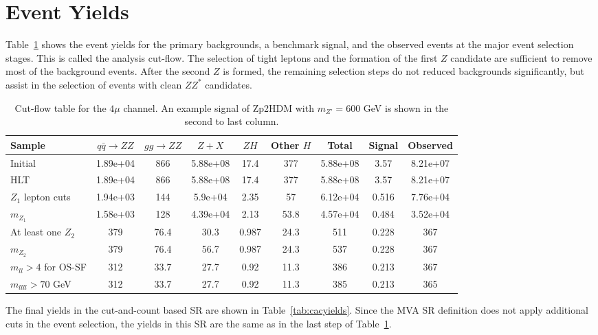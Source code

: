 \section{Event Yields}

Table~\ref{tab:smyields} shows the event yields for the primary backgrounds, a benchmark signal, and the observed events at the major event selection stages. This is called the analysis cut-flow. The selection of tight leptons and the formation of the first $Z$ candidate are sufficient to remove most of the background events. After the second $Z$ is formed, the remaining selection steps do not reduced backgrounds significantly, but assist in the selection of events with clean $ZZ^*$ candidates. 

\begin{table}[htbH]
\begin{center}
\begin{tabular}{ l | c | c | c | c | c | c | c | c }
\hline
\hline
Sample & $q\bar{q} \rightarrow ZZ$ & $gg \rightarrow ZZ$ & $Z+X$ & $ZH$ & Other $H$ & Total & Signal & Observed \\
\hline
Initial & 1.89e+04 & 866 & 5.88e+08 & 17.4 & 377 & 5.88e+08 & 3.57 & 8.21e+07 \\
\hline
HLT & 1.89e+04 & 866 & 5.88e+08 & 17.4 & 377 & 5.88e+08 & 3.57 & 8.21e+07 \\
\hline
$Z_1$ lepton cuts & 1.94e+03 & 144 & 5.9e+04 & 2.35 & 57 & 6.12e+04 & 0.516 & 7.76e+04 \\
\hline
$m_{Z_1}$ & 1.58e+03 & 128 & 4.39e+04 & 2.13 & 53.8 & 4.57e+04 & 0.484 & 3.52e+04 \\
\hline
At least one $Z_2$ & 379 & 76.4 & 30.3 & 0.987 & 24.3 & 511 & 0.228 & 367 \\
\hline
$m_{Z_2}$ & 379 & 76.4 & 56.7 & 0.987 & 24.3 & 537 & 0.228 & 367 \\
\hline
$m_{ll}>4$ for OS-SF & 312 & 33.7 & 27.7 & 0.92 & 11.3 & 386 & 0.213 & 367 \\
\hline
$m_{llll} > 70$ GeV & 312 & 33.7 & 27.7 & 0.92 & 11.3 & 385 & 0.213 & 365 \\
\hline
\hline
\end{tabular}
\caption{Cut-flow table for the $4\mu$ channel. An example signal of Zp2HDM with $m_{Z'}=600$ GeV is shown in the second to last column.}\label{tab:smyields}
\end{center}
\end{table}

The final yields in the cut-and-count based SR are shown in Table~\ref{tab:cacyields}. Since the MVA SR definition does not apply additional cuts in the event selection, the yields in this SR are the same as in the last step of Table~\ref{tab:smyields}.

